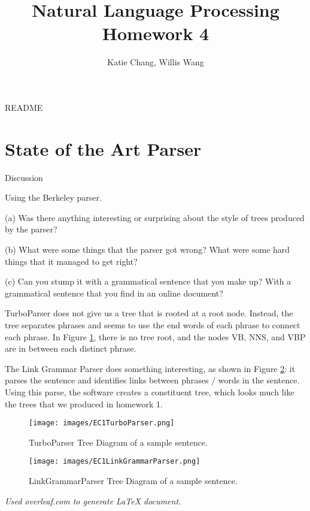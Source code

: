 \documentclass[12pt, letterpaper]{article}
\title{Natural Language Processing Homework 4}
\author{Katie Chang, Willis Wang}
\begin{document}
\maketitle

README

\section{State of the Art Parser}
Discussion

Using the Berkeley parser.

(a) Was there anything interesting or surprising about the style of trees produced by the parser?

(b) What were some things that the parser got wrong? What were some hard things that it managed to get right?

(c) Can you stump it with a grammatical sentence that you make up? With a grammatical sentence that you find in an online document?


TurboParser does not give us a tree that is rooted at a root node. Instead, the tree separates phrases and seems to use the end words of each phrase to connect each phrase. In Figure \ref{turboParser}, there is no tree root, and the nodes VB, NNS, and VBP are in between each distinct phrase. 

The Link Grammar Parser does something interesting, as shown in Figure \ref{lgParser}: it parses the sentence and identifies links between phrases / words in the sentence. Using this parse, the software creates a constituent tree, which looks much like the trees that we produced in homework 1.

\begin{figure}
\begin{center}
\texttt{[image: images/EC1TurboParser.png]}
\end{center}
\caption{TurboParser Tree Diagram of a sample sentence.}
\label{turboParser}
\end{figure}

\begin{figure}
\begin{center}
\texttt{[image: images/EC1LinkGrammarParser.png]}
\end{center}
\caption{LinkGrammarParser Tree Diagram of a sample sentence.}
\label{lgParser}
\end{figure}

\begin{center}
\textit{Used overleaf.com to generate LaTeX document.}
\end{center}
\end{document}
